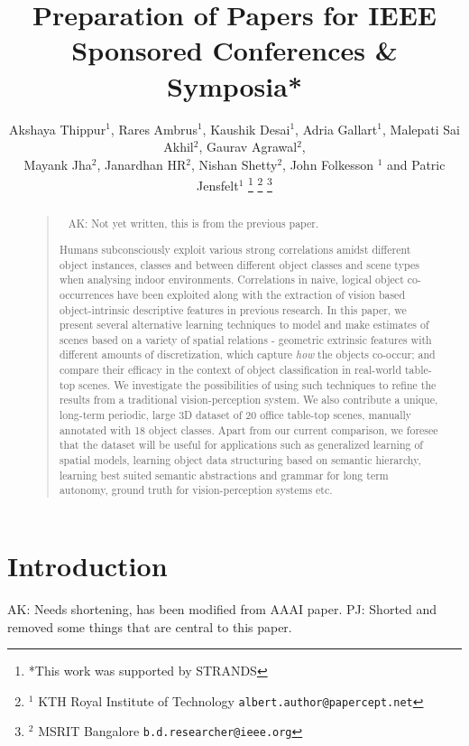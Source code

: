 \documentclass[letterpaper, 10 pt, conference]{ieeeconf}  %
\title{\LARGE \bf
Preparation of Papers for IEEE Sponsored Conferences \& Symposia*
}
\author{Akshaya Thippur$^{1}$, Rares Ambrus$^{1}$, Kaushik Desai$^{1}$, Adria Gallart$^{1}$, Malepati Sai Akhil$^{2}$, Gaurav Agrawal$^{2}$,\\Mayank Jha$^{2}$, Janardhan HR$^{2}$, Nishan Shetty$^{2}$, John Folkesson $^{1}$ and Patric Jensfelt$^{1}$%
\thanks{*This work was supported by STRANDS}%
\thanks{$^{1}$ KTH Royal Institute of Technology
        {\tt\small albert.author@papercept.net}}%
\thanks{$^{2}$ MSRIT Bangalore
        {\tt\small b.d.researcher@ieee.org}}%
}
\begin{document}
\maketitle
\thispagestyle{empty}
\pagestyle{empty}

\begin{abstract}
\begin{quote}\
{\color{blue} AK: Not yet written, this is from the previous paper.}

Humans subconsciously exploit various strong correlations amidst different object instances, classes and between different object classes and scene types when analysing indoor environments. Correlations in naive, logical object co-occurrences have been exploited along with the extraction of vision based object-intrinsic descriptive features in previous research. In this paper, we present several alternative learning techniques to model and make estimates of scenes based on a variety of spatial relations - geometric extrinsic features with different amounts of discretization, which capture \textit{how} the objects co-occur; and compare their efficacy in the context of object classification in real-world table-top scenes. We investigate the possibilities of using such techniques to refine the results from a traditional vision-perception system. We also contribute a unique, long-term periodic, large 3D dataset of 20 office table-top scenes, manually annotated with 18 object classes. Apart from our current comparison, we foresee that the dataset will be useful for applications such as generalized learning of spatial models, learning object data structuring based on semantic hierarchy, learning best suited semantic abstractions and grammar for long term autonomy, ground truth for vision-perception systems etc.

\end{quote}
\end{abstract}


\section{Introduction}
\label{sec:Introduction}

{\color{blue} AK: Needs shortening, has been modified from AAAI paper.}
{\color{red} PJ: Shorted and removed some things that are central to this paper.}
\end{document}
